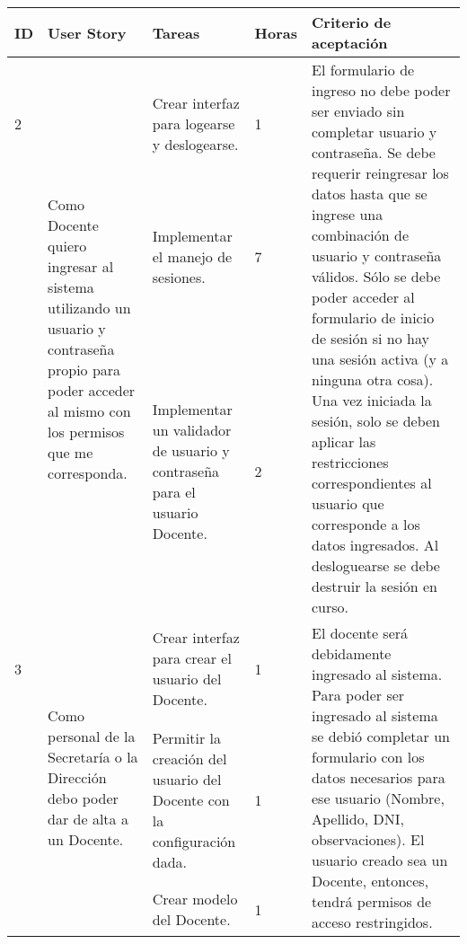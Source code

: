 \documentclass[a4paper, 11pt]{article}
\begin{document}
\begin{table}[H]
\centering
\begin{tabular}{ | p{0.5cm} | p{4cm} | p{5cm} | p{0.85cm} | p{5cm} |}
\hline 
ID & User Story & Tareas & Horas & Criterio de aceptación \\ \hline \hline


2 & \multirow{3}{4cm}{Como Docente quiero ingresar al sistema utilizando un usuario y contraseña propio para poder acceder al mismo con los permisos que me corresponda.} & Crear interfaz para logearse y deslogearse. & 1 & \multirow{3}{5cm}{El formulario de ingreso no debe poder ser enviado sin completar usuario y contraseña. Se debe requerir reingresar los datos hasta que se ingrese una combinación de usuario y contraseña válidos. Sólo se debe poder acceder al formulario de inicio de sesión si no hay una sesión activa (y a ninguna otra cosa). Una vez iniciada la sesión, solo se deben aplicar las restricciones correspondientes al usuario que corresponde a los datos ingresados. Al desloguearse se debe destruir la sesión en curso.} \\[3.4cm] \cline{3-4}
& & Implementar el manejo de sesiones. & 7 & \\[3.4cm] \cline{3-4}
& & Implementar un validador de usuario y contraseña para el usuario Docente. & 2 & \\[3.4cm] \hline


3 & \multirow{3}{4cm}{Como personal de la Secretaría o la Dirección debo poder dar de alta a un Docente.} & Crear interfaz para crear el usuario del Docente. & 1 & \multirow{3}{5cm}{El docente será debidamente ingresado al sistema. Para poder ser ingresado al sistema se debió completar un formulario con los datos necesarios para ese usuario (Nombre, Apellido, DNI, observaciones). El usuario creado sea un Docente, entonces, tendrá permisos de acceso restringidos. } \\[2.5cm] \cline{3-4} 
& & Permitir la creación del usuario del Docente con la configuración dada. & 1 & \\[2.5cm] \cline{3-4}
& & Crear modelo del Docente. & 1 & \\[2.5cm] \hline

\end{tabular}
\end{table}
\end{document}

